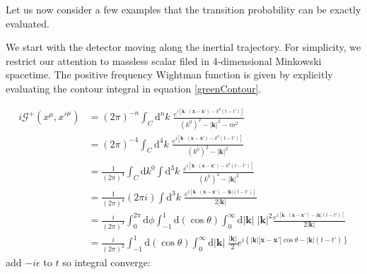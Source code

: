 \documentclass[12pt]{article}
\numberwithin{equation}{section}
\theoremstyle{1style}
\newcommand{\id}{\mathrm{d}}
\begin{document}

Let us now consider a few examples that the transition probability can be exactly evaluated.

\bigskip
We start with the detector moving along the inertial trajectory.
For simplicity, we restrict our attention to massless scalar filed in 4-dimensional Minkowski spacetime.
The positive frequency Wightman function is given by explicitly evaluating the contour integral in equation \ref{greenContour}.

\begin{align}
  i\mathcal{G}^+(x^{\mu},x'^{\mu}) & =(2\pi)^{-n}\int_{C}\id^nk\;\frac{e^{i\left[\mathbf{k}\cdot(\mathbf{x}-\mathbf{x'})-k^0(t-t')\right]}}{(k^0)^2-|\mathbf{k}|^2-m^2}                                                                          \\
                                   & =(2\pi)^{-4}\int_{C}\id^4k\;\frac{e^{i\left[\mathbf{k}\cdot(\mathbf{x}-\mathbf{x'})-k^0(t-t')\right]}}{(k^0)^2-|\mathbf{k}|^2}                                                                              \\
                                   & =\frac{1}{(2\pi)^4}\int_{C}\id k^0 \int\id^3k\;\frac{e^{i\left[\mathbf{k}\cdot(\mathbf{x}-\mathbf{x'})-k^0(t-t')\right]}}{(k^0)^2-|\mathbf{k}|^2}                                                           \\
                                   & =\frac{1}{(2\pi)^4}(2\pi i)\int\id^3k\;\frac{e^{i\left[\mathbf{k}\cdot(\mathbf{x}-\mathbf{x'})-|\mathbf{k}|(t-t')\right]}}{2|\mathbf{k}|}                                                                   \\
                                   & =\frac{i}{(2\pi)^3}\int_{0}^{2\pi}\id\phi\int_{-1}^{1}\id(\cos\theta)\int_{0}^{\infty}\id|\mathbf{k}|\;|\mathbf{k}|^2\frac{e^{i\left[\mathbf{k}\cdot(\mathbf{x}-\mathbf{x'})-|\mathbf{k}|(t-t')\right]}}{2|\mathbf{k}|}                \\
                                   & =\frac{i}{(2\pi)^2}\int_{-1}^{1}\id(\cos\theta)\int_{0}^{\infty}\id|\mathbf{k}|\;\frac{|\mathbf{k}|}{2}e^{i \left\{ \left|\mathbf{k}\right| \left|\mathbf{x}-\mathbf{x'}\right| \cos\theta - |\mathbf{k}|(t-t')\right\}} 
\end{align}
add \(-i\epsilon\) to \(t\) so integral converge:
\end{document}
